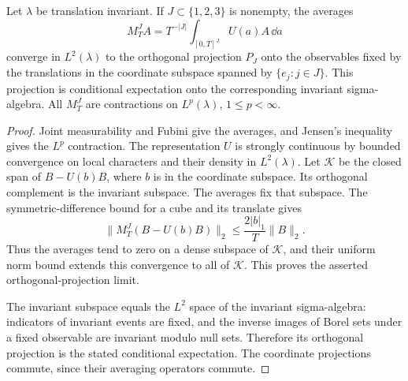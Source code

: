 \begin{lemma}\label{lem:averages-translations}
Let \(\lambda\) be translation invariant. If \(J\subset\{1,2,3\}\)
is nonempty, the averages
\[
 M_T^J A=T^{-|J|}\int_{[0,T]^J}U(a)A\,\dd a
\]
converge in \(L^2(\lambda)\) to the orthogonal projection \(P_J\)
onto the observables fixed by the translations in the coordinate
subspace spanned by \(\{e_j:j\in J\}\).
This projection is conditional expectation onto the corresponding
invariant sigma-algebra. All \(M_T^J\) are contractions on
\(L^p(\lambda)\), \(1\le p<\infty\).
\end{lemma}
\begin{proof}
Joint measurability and Fubini give the averages, and Jensen's
inequality gives the \(L^p\) contraction. The representation \(U\)
is strongly continuous by bounded convergence on local characters
and their density in \(L^2(\lambda)\).
Let \(\mathcal K\) be the closed span of
\(B-U(b)B\), where \(b\) is in the coordinate subspace.
Its orthogonal complement is the invariant subspace.
The averages fix that subspace. The symmetric-difference bound
for a cube and its translate gives
\[
 \|M_T^J(B-U(b)B)\|_2
 \le\frac{2|b|_1}{T}\|B\|_2.
\]
Thus the averages tend to zero on a dense subspace of
\(\mathcal K\), and their uniform norm bound extends this
convergence to all of \(\mathcal K\).
This proves the asserted orthogonal-projection limit.

The invariant subspace equals the \(L^2\) space of the invariant
sigma-algebra: indicators of invariant events are fixed, and
the inverse images of Borel sets under a fixed observable are
invariant modulo null sets. Therefore its orthogonal projection
is the stated conditional expectation. The coordinate projections
commute, since their averaging operators commute.
\end{proof}
\printbibliography

